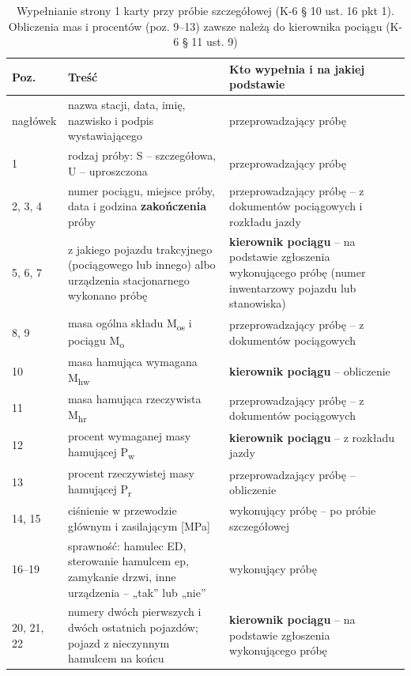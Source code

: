 \begin{table}[h]
	\centering
	\footnotesize
	\renewcommand{\arraystretch}{1.15}
	\begin{tabularx}{\linewidth}{@{}l>{\raggedright\arraybackslash}X>{\raggedright\arraybackslash}X@{}}
		\toprule
		\textbf{Poz.} & \textbf{Treść} & \textbf{Kto wypełnia i na jakiej podstawie} \\
		\midrule
		nagłówek & nazwa stacji, data, imię, nazwisko i podpis wystawiającego & przeprowadzający próbę \\
		1 & rodzaj próby: S – szczegółowa, U – uproszczona & przeprowadzający próbę \\
		2, 3, 4 & numer pociągu, miejsce próby, data i godzina \textbf{zakończenia} próby & przeprowadzający próbę – z dokumentów pociągowych i rozkładu jazdy \\
		5, 6, 7 & z jakiego pojazdu trakcyjnego (pociągowego lub innego) albo urządzenia stacjonarnego wykonano próbę & \textbf{kierownik pociągu} – na podstawie zgłoszenia wykonującego próbę (numer inwentarzowy pojazdu lub stanowiska) \\
		8, 9 & masa ogólna składu M\textsubscript{os} i pociągu M\textsubscript{o} & przeprowadzający próbę – z dokumentów pociągowych \\
		10 & masa hamująca wymagana M\textsubscript{hw} & \textbf{kierownik pociągu} – obliczenie \\
		11 & masa hamująca rzeczywista M\textsubscript{hr} & przeprowadzający próbę – z dokumentów pociągowych \\
		12 & procent wymaganej masy hamującej P\textsubscript{w} & \textbf{kierownik pociągu} – z rozkładu jazdy \\
		13 & procent rzeczywistej masy hamującej P\textsubscript{r} & przeprowadzający próbę – obliczenie \\
		14, 15 & ciśnienie w przewodzie głównym i zasilającym [MPa] & wykonujący próbę – po próbie szczegółowej \\
		16–19 & sprawność: hamulec ED, sterowanie hamulcem ep, zamykanie drzwi, inne urządzenia – „tak” lub „nie” & wykonujący próbę \\
		20, 21, 22 & numery dwóch pierwszych i dwóch ostatnich pojazdów; pojazd z nieczynnym hamulcem na końcu & \textbf{kierownik pociągu} – na podstawie zgłoszenia wykonującego próbę \\
		\bottomrule
	\end{tabularx}
	\caption{Wypełnianie strony 1 karty przy próbie szczegółowej (K-6 § 10 ust. 16 pkt 1). Obliczenia mas i procentów (poz. 9–13) zawsze należą do kierownika pociągu (K-6 § 11 ust. 9)}
	\label{tab:karta-kto}
\end{table}

